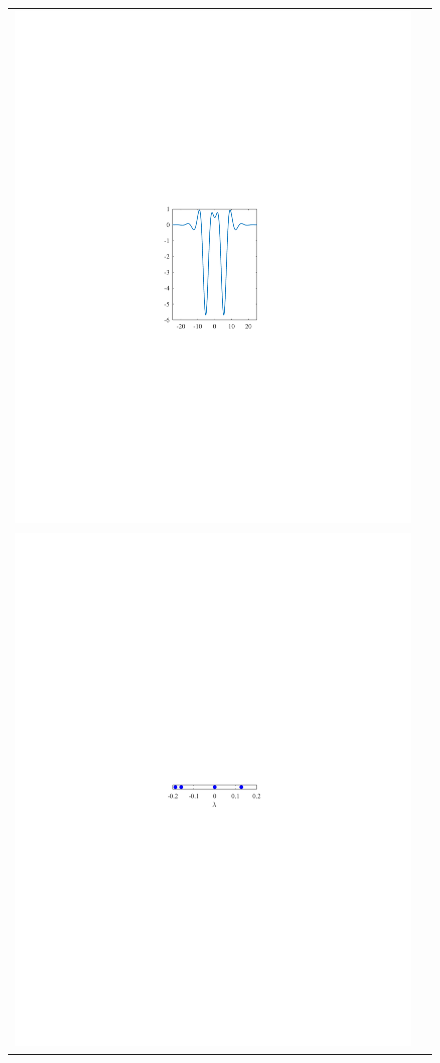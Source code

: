 \documentclass[review,onefignum,onetabnum]{siamart171218}
\begin{document}
\begin{figure}[ht]
\begin{tabular}{cc}
\includegraphics{double2}\\
\includegraphics{specA0d1}&

\end{tabular}
\end{figure}
\end{document}
